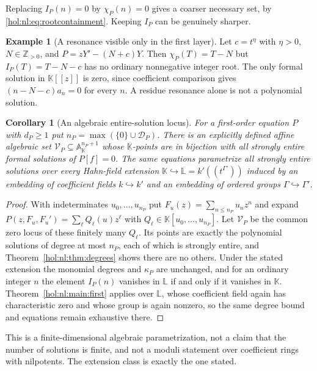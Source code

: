 \documentclass[11pt]{article}
\numberwithin{equation}{section}
\newtheorem{corollary}[theorem]{Corollary}
\theoremstyle{definition}
\newtheorem{example}[theorem]{Example}
\theoremstyle{remark}
\newcommand{\Z}{\mathbb Z}
\newcommand{\KK}{\mathbb K}
\begin{document}
Replacing $I_P(n)=0$ by $\chi_P(n)=0$ gives a coarser necessary set, by
\eqref{hol:nl:eq:rootcontainment}. Keeping $I_P$ can be genuinely sharper.

\begin{example}[A resonance visible only in the first layer]
\label{hol:nl:ex:resonance}
Let $c=t^\eta$ with $\eta>0$, $N\in\Z_{>0}$, and $P=zY'-(N+c)Y$. Then
$\chi_P(T)=T-N$ but $I_P(T)=T-N-c$ has no ordinary nonnegative integer root.
The only formal solution in $\KK[[z]]$ is zero, since coefficient comparison
gives $(n-N-c)a_n=0$ for every $n$. A residue resonance alone is not a
polynomial solution.
\end{example}

\begin{corollary}[An algebraic entire-solution locus]\label{hol:nl:cor:locus}
For a first-order equation $P$ with $d_P\ge1$ put
$n_P=\max(\{0\}\cup\mathcal D_P)$. There is an explicitly defined affine
algebraic set $\mathcal V_P\subseteq\mathbb A_{\KK}^{n_P+1}$ whose
$\KK$-points are in bijection with all strongly entire formal solutions of
$P[f]=0$. The same equations parametrize all strongly entire solutions over
every Hahn-field extension $\KK\hookrightarrow\mathbb L=k'((t^{\Gamma'}))$
induced by an embedding of coefficient fields $k\hookrightarrow k'$ and an
embedding of ordered groups $\Gamma\hookrightarrow\Gamma'$.
\end{corollary}

\begin{proof}
With indeterminates $u_0,\ldots,u_{n_P}$ put $F_u(z)=\sum_{n\le n_P}u_nz^n$ and
expand $P(z,F_u,F_u')=\sum_\ell Q_\ell(u)z^\ell$ with
$Q_\ell\in\KK[u_0,\ldots,u_{n_P}]$. Let $\mathcal V_P$ be the common zero
locus of these finitely many $Q_\ell$. Its points are exactly the polynomial
solutions of degree at most $n_P$, each of which is strongly entire, and
Theorem~\ref{hol:nl:thm:degrees} shows there are no others. Under the stated
extension the monomial degrees and $\kappa_P$ are unchanged, and for an
ordinary integer $n$ the element $I_P(n)$ vanishes in $\mathbb L$ if and only
if it vanishes in $\KK$. Theorem~\ref{hol:nl:main:first} applies over
$\mathbb L$, whose coefficient field again has characteristic zero and whose
group is again nonzero, so the same degree bound and equations remain
exhaustive there.
\end{proof}

This is a finite-dimensional algebraic parametrization, not a claim that the
number of solutions is finite, and not a moduli statement over coefficient
rings with nilpotents. The extension class is exactly the one stated.
\end{document}
